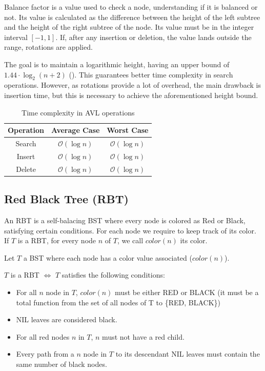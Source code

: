 \documentclass[12pt,a4paper]{article}
\begin{document}
        Balance factor is a value used to check a node, understanding if it is balanced or not. Its value is calculated as the difference between the height of the left subtree and the height of the right subtree of the node. Its value must be in the integer interval $[-1,1]$. If, after any insertion or deletion, the value lands outside the range, rotations are applied.

        The goal is to maintain a logarithmic height, having an upper bound of $1.44 \cdot \log_2 (n+2)$ (\textcite{adelson-velsky1962}). This guarantees better time complexity in search operations. However, as rotations provide a lot of overhead, the main drawback is insertion time, but this is necessary to achieve the aforementioned height bound.

        \begin{table}[ht]
            \centering
                \begin{tabular}{c|c|c}
                    \hline
                    \textbf{Operation} & \textbf{Average Case} & \textbf{Worst Case} \\
                    \hline
                    Search & $\mathcal{O}(\log n)$ & $\mathcal{O}(\log n)$ \\
                    Insert & $\mathcal{O}(\log n)$ & $\mathcal{O}(\log n)$ \\
                    Delete & $\mathcal{O}(\log n)$ & $\mathcal{O}(\log n)$ \\
                    \hline
                \end{tabular}
                \caption{Time complexity in AVL operations}
        \end{table}

    \subsection{Red Black Tree (RBT)}

        An RBT is a self-balacing BST where every node is colored as Red or Black, satisfying certain conditions. For each node we require to keep track of its color. If $T$ is a RBT, for every node $n$ of $T$, we call $color(n)$ its color.

        Let $T$ a BST where each node has a color value associated ($color(n)$).

        $T$ is a RBT $\iff$ $T$ satisfies the following conditions:
        \begin{itemize}
            \item For all $n$ node in $T$, $color(n)$ must be either RED or BLACK (it must be a total function from the set of all nodes of T to \{RED, BLACK\})
            \item NIL leaves are considered black.
            \item For all red nodes $n$ in $T$, $n$ must not have a red child.
            \item Every path from a $n$ node in $T$ to its descendant NIL leaves must contain the same number of black nodes.
        \end{itemize}
\end{document}
